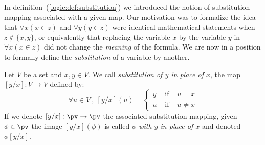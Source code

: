 In definition~(\ref{logic:def:substitution}) we introduced the
notion of substitution mapping associated with a given map. Our
motivation was to formalize the idea that $\forall x(x\in z)$ and
$\forall y(y\in z)$ were identical mathematical statements when
$z\not\in\{x,y\}$, or equivalently that replacing the variable $x$
by the variable $y$ in $\forall x(x\in z)$ did not change the {\em
meaning} of the formula. We are now in a position to formally define
the {\em substitution} of a variable by another.
\begin{defin}\label{logic:def:single:var:substitution}
    Let $V$ be a set and $x,y\in V$. We call {\em substitution of $y$ in
    place of $x$}, the map $[y/x]:V\to V$ defined by:
        \[
            \forall u\in V\ ,\ [y/x](u)=
                \left\{
                    \begin{array}{lcl}
                        y&\mbox{\ if\ }&u=x\\
                        u&\mbox{\ if\ }&u\neq x
                    \end{array}
                \right.
        \]
    If we denote $[y/x]:\pv\to\pv$ the associated substitution mapping,
    given $\phi\in\pv$ the image $[y/x](\phi)$ is called {\em $\phi$
    with $y$ in place of $x$} and denoted $\phi[y/x]$.
\end{defin}

